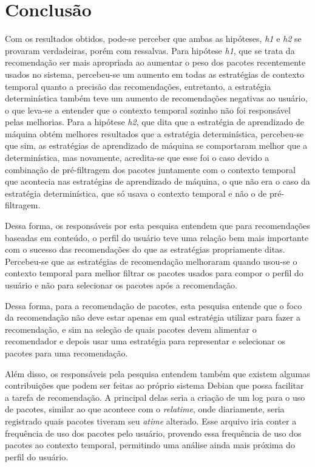 \chapter[Conclusão]{Conclusão}

Com os resultados obtidos, pode-se perceber que ambas as hipóteses, \textit{h1}
e \textit{h2} se provaram verdadeiras, porém com ressalvas. Para hipótese
\textit{h1}, que se trata da recomendação ser mais apropriada ao aumentar o
peso dos pacotes recentemente usados no sistema, percebeu-se um aumento em todas
as estratégias de contexto temporal quanto a precisão das recomendações,
entretanto, a estratégia determinística também teve um aumento de recomendações
negativas ao usuário, o que leva-se a entender que o contexto temporal sozinho
não foi responsável pelas melhorias. Para a hipótese \textit{h2}, que dita que
a estratégia de aprendizado de máquina obtém melhores resultados que a estratégia
determinística, percebeu-se que sim, as estratégias de aprendizado de máquina se
comportaram melhor que a determinística, mas novamente, acredita-se que esse foi
o caso devido a combinação de pré-filtragem dos pacotes juntamente com o contexto
temporal que acontecia nas estratégias de aprendizado de máquina, o que não era o
caso da estratégia determinística, que só usava o contexto temporal e não o de
pré-filtragem.

Dessa forma, os responsáveis por esta pesquisa entendem que para recomendações
baseadas em conteúdo, o perfil do usuário teve uma relação bem mais importante
com o sucesso das recomendações do que as estratégias propriamente ditas.
Percebeu-se que as estratégias de recomendação melhoraram quando usou-se o
contexto temporal para melhor filtrar os pacotes usados para compor o perfil do
usuário e não para selecionar os pacotes após a recomendação.

Dessa forma, para a recomendação de pacotes, esta pesquisa entende que o foco da
recomendação não deve estar apenas em qual estratégia utilizar para fazer a
recomendação, e sim na seleção de quais pacotes devem alimentar o recomendador e
depois usar uma estratégia para representar e selecionar os pacotes para uma
recomendação.

Além disso, os responsáveis pela pesquisa entendem também que existem algumas
contribuições que podem ser feitas ao próprio sistema Debian que possa facilitar
a tarefa de recomendação. A principal delas seria a criação de um log para o uso de
pacotes, similar ao que acontece com o \textit{relatime}, onde diariamente, seria registrado
quais pacotes tiveram seu \textit{atime} alterado. Esse arquivo iria conter a frequência
de uso dos pacotes pelo usuário, provendo essa frequência de uso dos pacotes ao
contexto temporal, permitindo uma análise ainda mais próxima do perfil do usuário.

